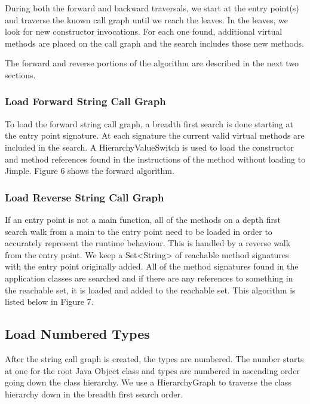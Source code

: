 \documentclass[preprint]{sigplanconf}
\begin{document}
During both the forward and backward traversals, we start at the entry point(s) and traverse the known call graph until we reach the leaves. In the leaves, we look for new constructor invocations. For each one found, additional virtual methods are placed on the call graph and the search includes those new methods. 

The forward and reverse portions of the algorithm are described in the next two sections.

\subsubsection{Load Forward String Call Graph}
To load the forward string call graph, a breadth first search is done starting at the entry point signature. At each signature the current valid virtual methods are included in the search. A HierarchyValueSwitch is used to load the constructor and method references found in the instructions of the method without loading to Jimple. Figure 6 shows the forward algorithm. 

\subsubsection{Load Reverse String Call Graph}
If an entry point is not a main function, all of the methods on a depth first search walk from a main to the entry point need to be loaded in order to accurately represent the runtime behaviour. This is handled by a reverse walk from the entry point. We keep a Set<String> of reachable method signatures with the entry point originally added. All of the method signatures found in the application classes are searched and if there are any references to something in the reachable set, it is loaded and added to the reachable set. This algorithm is listed below in Figure 7.

\subsection{Load Numbered Types}
\label{sec:numbering}
After the string call graph is created, the types are numbered. The number starts at one for the root Java Object class and types are numbered in ascending order going down the class hierarchy. We use a HierarchyGraph to traverse the class hierarchy down in the breadth first search order.
\end{document}
